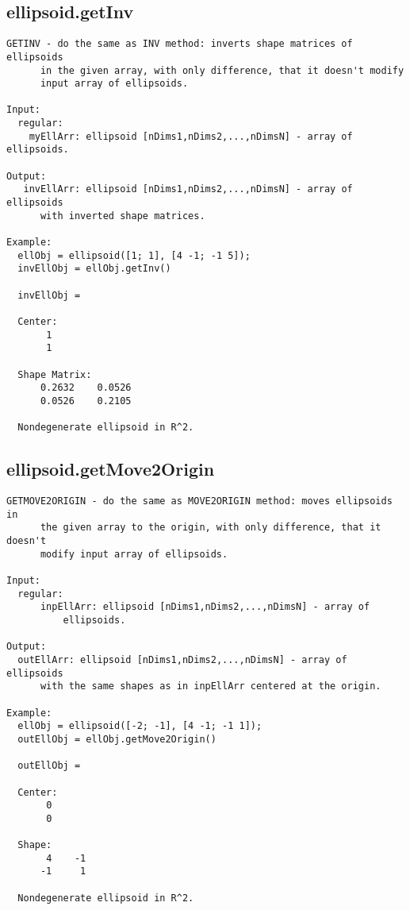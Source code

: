 \subsection{\texorpdfstring{ellipsoid.getInv}{getInv}}\label{method:ellipsoid.getInv}
\begin{verbatim}
GETINV - do the same as INV method: inverts shape matrices of ellipsoids
      in the given array, with only difference, that it doesn't modify
      input array of ellipsoids.

Input:
  regular:
    myEllArr: ellipsoid [nDims1,nDims2,...,nDimsN] - array of ellipsoids.

Output:
   invEllArr: ellipsoid [nDims1,nDims2,...,nDimsN] - array of ellipsoids
      with inverted shape matrices.

Example:
  ellObj = ellipsoid([1; 1], [4 -1; -1 5]);
  invEllObj = ellObj.getInv()

  invEllObj =

  Center:
       1
       1

  Shape Matrix:
      0.2632    0.0526
      0.0526    0.2105

  Nondegenerate ellipsoid in R^2.
\end{verbatim}
\subsection{\texorpdfstring{ellipsoid.getMove2Origin}{getMove2Origin}}\label{method:ellipsoid.getMove2Origin}
\begin{verbatim}
GETMOVE2ORIGIN - do the same as MOVE2ORIGIN method: moves ellipsoids in
      the given array to the origin, with only difference, that it doesn't
      modify input array of ellipsoids.

Input:
  regular:
      inpEllArr: ellipsoid [nDims1,nDims2,...,nDimsN] - array of
          ellipsoids.

Output:
  outEllArr: ellipsoid [nDims1,nDims2,...,nDimsN] - array of ellipsoids
      with the same shapes as in inpEllArr centered at the origin.

Example:
  ellObj = ellipsoid([-2; -1], [4 -1; -1 1]);
  outEllObj = ellObj.getMove2Origin()

  outEllObj =

  Center:
       0
       0

  Shape:
       4    -1
      -1     1

  Nondegenerate ellipsoid in R^2.
\end{verbatim}

